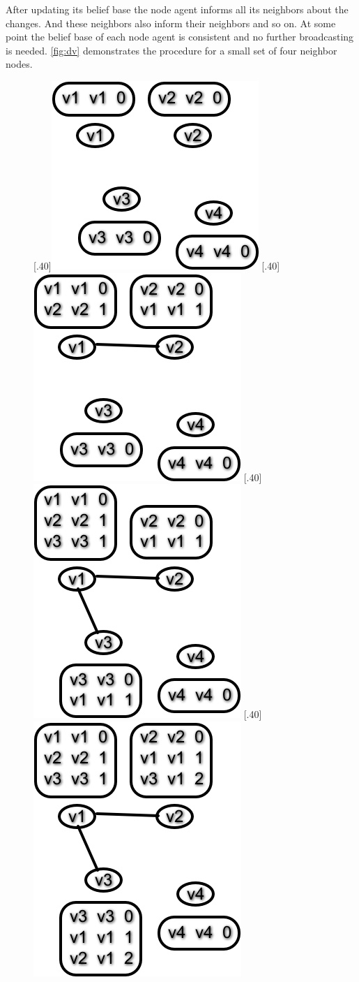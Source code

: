 After updating its belief base the node agent informs all its neighbors about the changes. And these neighbors also inform their neighbors and so on. At some point the belief base of each node agent is consistent and no further broadcasting is needed. \autoref{fig:dv} demonstrates the procedure for a small set of four neighbor nodes.

\begin{figure}
  \centering
  [.40\linewidth]{\includegraphics[width=.40\linewidth]{images/dv0.png}}
  [.40\linewidth]{\includegraphics[width=.40\linewidth]{images/dv1.png}}
   [.40\linewidth]{\includegraphics[width=.40\linewidth]{images/dv2.png}}
   [.40\linewidth]{\includegraphics[width=.40\linewidth]{images/dv3.png}}

\end{figure}
